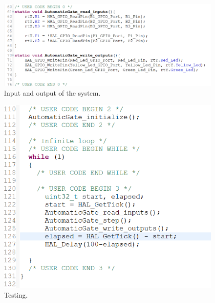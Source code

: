 \documentclass[12pt]{article}
\begin{document}
\begin{figure}[H]
    \hspace{0.72cm}
    \includegraphics[width=1\textwidth]{snippet/input_output.png}
    \caption{Input and output of the system.}
\end{figure}
\begin{figure}[H]
    \hspace{0.9cm}
    \includegraphics[width=1\textwidth]{snippet/main.png}
    \caption{Testing.}
\end{figure}
\newpage
\end{document}
